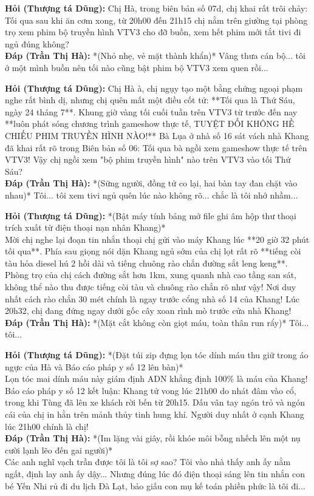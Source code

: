 \documentclass[12pt,a4paper]{article}
\begin{document}
\noindent \textbf{Hỏi (Thượng tá Dũng):} Chị Hà, trong biên bản số 07d, chị khai rất trôi chảy: Tối qua sau khi ăn cơm xong, từ 20h00 đến 21h15 chị nằm trên giường tại phòng trọ xem phim bộ truyền hình VTV3 cho đỡ buồn, xem hết phim mới tắt tivi đi ngủ đúng không?\\
\textbf{Đáp (Trần Thị Hà):} *(Nhỏ nhẹ, vẻ mặt thành khẩn)* Vâng thưa cán bộ... tôi ở một mình buồn nên tối nào cũng bật phim bộ VTV3 xem quen rồi...

\noindent \textbf{Hỏi (Thượng tá Dũng):} Chị Hà à, chị ngụy tạo một bằng chứng ngoại phạm nghe rất bình dị, nhưng chị quên mất một điều cốt tử: **Tối qua là Thứ Sáu, ngày 24 tháng 7**. Khung giờ vàng tối cuối tuần trên VTV3 từ trước đến nay **luôn phát sóng chương trình gameshow thực tế, TUYỆT ĐỐI KHÔNG HỀ CHIẾU PHIM TRUYỀN HÌNH NÀO!** Bà Lụa ở nhà số 16 sát vách nhà Khang đã khai rất rõ trong Biên bản số 06: Tối qua bà ngồi xem gameshow thực tế trên VTV3! Vậy chị ngồi xem "bộ phim truyền hình" nào trên VTV3 vào tối Thứ Sáu?\\
\textbf{Đáp (Trần Thị Hà):} *(Sững người, đồng tử co lại, hai bàn tay đan chặt vào nhau)* Tôi... tôi xem tivi ngủ quên lúc nào không rõ... chắc là tôi nhớ nhầm...

\noindent \textbf{Hỏi (Thượng tá Dũng):} *(Bật máy tính bảng mở file ghi âm hộp thư thoại trích xuất từ điện thoại nạn nhân Khang)*\\
Mời chị nghe lại đoạn tin nhắn thoại chị gửi vào máy Khang lúc **20 giờ 32 phút tối qua**. Phía sau giọng nói dặn Khang ngủ sớm của chị lọt rất rõ **tiếng còi tàu hỏa diesel hú 2 hồi dài và tiếng chuông rào chắn đường sắt leng keng**. Phòng trọ của chị cách đường sắt hơn 1km, xung quanh nhà cao tầng san sát, không thể nào thu được tiếng còi tàu và chuông rào chắn rõ như vậy! Nơi duy nhất cách rào chắn 30 mét chính là ngay trước cổng nhà số 14 của Khang! Lúc 20h32, chị đang đứng ngay dưới gốc cây xoan rình mò trước cửa nhà Khang!\\
\textbf{Đáp (Trần Thị Hà):} *(Mặt cắt không còn giọt máu, toàn thân run rẩy)* Tôi... tôi...

\noindent \textbf{Hỏi (Thượng tá Dũng):} *(Đặt túi zip đựng lọn tóc dính máu thu giữ trong áo ngực của Hà và Báo cáo pháp y số 12 lên bàn)*\\
Lọn tóc mai dính máu này giám định ADN khẳng định 100\% là máu của Khang! Báo cáo pháp y số 12 kết luận: Khang tử vong lúc 21h00 do nhát đâm vào cổ, trong khi Tùng đã lên xe khách rời bến từ 20h15. Dấu vân tay ngón trỏ và ngón cái của chị in hằn trên mảnh thủy tinh hung khí. Người duy nhất ở cạnh Khang lúc 21h00 chính là chị!\\
\textbf{Đáp (Trần Thị Hà):} *(Im lặng vài giây, rồi khóe môi bỗng nhếch lên một nụ cười lạnh lẽo đến gai người)*\\
Các anh nghĩ vạch trần được tôi là tôi sợ sao? Tôi vào nhà thấy anh ấy nằm ngất, định lay anh ấy dậy... Nhưng đúng lúc đó điện thoại sáng lên tin nhắn con bé Yến Nhi rủ đi du lịch Đà Lạt, bảo giấu con mụ kế toán phiền phức là tôi đi... 
\end{document}

